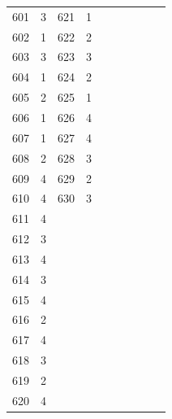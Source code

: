 {\begin{tabular}{|c|c||c|c||c|c||c|c||c|c|}
\hline
601 & 3 & 621 & 1 &  &  &  &  &  &  \\
602 & 1 & 622 & 2 &  &  &  &  &  &  \\
603 & 3 & 623 & 3 &  &  &  &  &  &  \\
604 & 1 & 624 & 2 &  &  &  &  &  &  \\
605 & 2 & 625 & 1 &  &  &  &  &  &  \\
606 & 1 & 626 & 4 &  &  &  &  &  &  \\
607 & 1 & 627 & 4 &  &  &  &  &  &  \\
608 & 2 & 628 & 3 &  &  &  &  &  &  \\
609 & 4 & 629 & 2 &  &  &  &  &  &  \\
610 & 4 & 630 & 3 &  &  &  &  &  &  \\
611 & 4 &  &  &  &  &  &  &  &  \\
612 & 3 &  &  &  &  &  &  &  &  \\
613 & 4 &  &  &  &  &  &  &  &  \\
614 & 3 &  &  &  &  &  &  &  &  \\
615 & 4 &  &  &  &  &  &  &  &  \\
616 & 2 &  &  &  &  &  &  &  &  \\
617 & 4 &  &  &  &  &  &  &  &  \\
618 & 3 &  &  &  &  &  &  &  &  \\
619 & 2 &  &  &  &  &  &  &  &  \\
620 & 4 &  &  &  &  &  &  &  &  \\
\hline
\end{tabular}\par\bigskip
}
